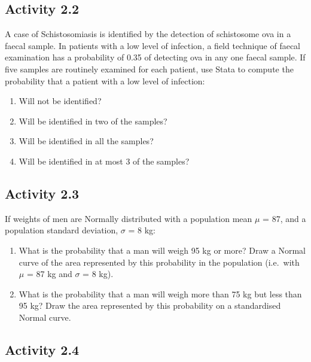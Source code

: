 \documentclass[
]{memoir}
\providecommand{\tightlist}{%
  \setlength{\itemsep}{0pt}\setlength{\parskip}{0pt}}
\begin{document}
\hypertarget{activity-2.2}{%
\subsection*{Activity 2.2}\label{activity-2.2}}

A case of Schistosomiasis is identified by the detection of schistosome ova in a faecal sample. In patients with a low level of infection, a field technique of faecal examination has a probability of 0.35 of detecting ova in any one faecal sample. If five samples are routinely examined for each patient, use Stata to compute the probability that a patient with a low level of infection:

\begin{enumerate}
\def\labelenumi{\alph{enumi})}
\tightlist
\item
  Will not be identified?
\item
  Will be identified in two of the samples?
\item
  Will be identified in all the samples?
\item
  Will be identified in at most 3 of the samples?
\end{enumerate}

\hypertarget{activity-2.3}{%
\subsection*{Activity 2.3}\label{activity-2.3}}

If weights of men are Normally distributed with a population mean \(\mu\) = 87, and a population standard deviation, \(\sigma\) = 8 kg:

\begin{enumerate}
\def\labelenumi{\alph{enumi})}
\tightlist
\item
  What is the probability that a man will weigh 95 kg or more? Draw a Normal curve of the area represented by this probability in the population (i.e.~with \(\mu\) = 87 kg and \(\sigma\) = 8 kg).
\item
  What is the probability that a man will weigh more than 75 kg but less than 95 kg? Draw the area represented by this probability on a standardised Normal curve.
\end{enumerate}

\hypertarget{activity-2.4}{%
\subsection*{Activity 2.4}\label{activity-2.4}}
\end{document}
